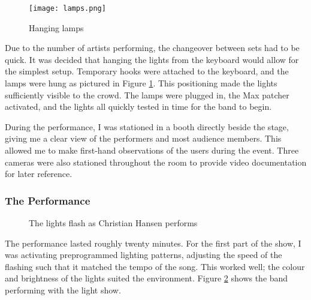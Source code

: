 \begin{figure}
	\centering

	\texttt{[image: lamps.png]}
	\caption{Hanging lamps}

	\label{prototyping3.9}
\end{figure}

Due to the number of artists performing, the changeover between sets had to be quick. It was decided that hanging the lights from the keyboard would allow for the simplest setup. Temporary hooks were attached to the keyboard, and the lamps were hung as pictured in Figure \ref{prototyping3.9}. This positioning made the lights sufficiently visible to the crowd. The lamps were plugged in, the Max patcher activated, and the lights all quickly tested in time for the band to begin.

During the performance, I was stationed in a booth directly beside the stage, giving me a clear view of the performers and most audience members. This allowed me to make first-hand observations of the users during the event. Three cameras were also stationed throughout the room to provide video documentation for later reference.

\subsubsection{The Performance}

\begin{figure}
	\centering

	\hspace{0.1cm}

	\caption{The lights flash as Christian Hansen performs}

	\label{prototyping3.10}
\end{figure}

The performance lasted roughly twenty minutes. For the first part of the show, I was activating preprogrammed lighting patterns, adjusting the speed of the flashing such that it matched the tempo of the song. This worked well; the colour and brightness of the lights suited the environment. Figure \ref{prototyping3.10} shows the band performing with the light show.

